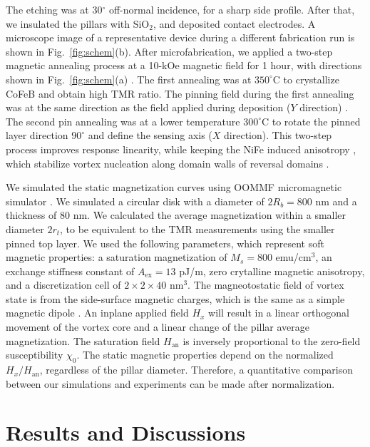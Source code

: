 \documentclass[10pt]{iopart}
\begin{document}
    The etching was at 30$^\circ$ off-normal incidence, for a sharp side profile. After that, we insulated the pillars with SiO$_2$, and deposited contact electrodes. A microscope image of a representative device during a different fabrication run is shown in Fig.~\ref{fig:schem}(b). After microfabrication, we applied a two-step magnetic annealing process at a 10-kOe magnetic field for 1 hour, with directions shown in Fig.~\ref{fig:schem}(a) \cite{fujiwara_2012_13}. The first annealing was at $350^\circ\mathrm{C}$ to crystallize CoFeB and obtain high TMR ratio. { The pinning field during the first annealing was at the same direction as the field applied during deposition ($Y$ direction) \cite{NoteSupp}}. The second pin annealing was at {a lower temperature $300^\circ\mathrm{C}$ to rotate the pinned layer direction $90^\circ$ and define the sensing axis ($X$ direction)}. This two-step process improves response linearity, while keeping the NiFe induced anisotropy \cite{fujiwara_2012_13}, which stabilize vortex nucleation along domain walls of reversal domains \cite{NoteSupp}.
    
    We simulated the static magnetization curves using OOMMF micromagnetic simulator \cite{oommf}. We simulated a circular disk with a diameter of $2R_b = 800$ nm and a thickness of 80 nm. We calculated the average magnetization within a smaller diameter $2r_t$, to be equivalent to the TMR measurements using the smaller pinned top layer. We used the following parameters, which represent soft magnetic properties: a saturation magnetization of $M_s = 800$ emu/cm$^3$, an exchange stiffness constant of $A_\mathrm{ex} = 13$ pJ/m, {zero crytalline magnetic anisotropy}, and a discretization cell of $2\times 2 \times 40$ nm$^3$. 
    The magneotostatic field of vortex state is from the side-surface magnetic charges, which is the same as a simple magnetic dipole \cite{guslienko_2001a,vogel_2010}. An inplane applied field $H_x$ will result in a linear orthogonal movement of the vortex core and a linear change of the pillar average magnetization. The saturation field $H_\mathrm{an}$ is inversely proportional to the zero-field susceptibility $\chi_0$. The static magnetic properties depend on the normalized $H_x/H_\mathrm{an}$, regardless of the pillar diameter. Therefore, a quantitative comparison between our simulations and experiments can be made after normalization.
    
\section{Results and Discussions}
    
\end{document}
